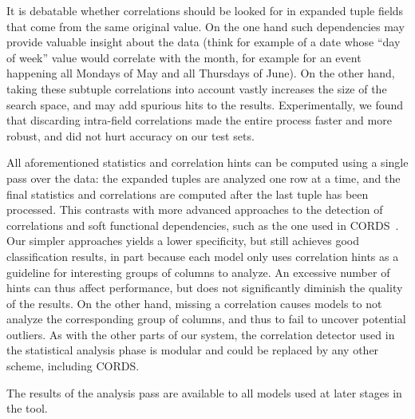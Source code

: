 It is debatable whether correlations should be looked for in expanded tuple fields that come from the same original value. On the one hand such dependencies may provide valuable insight about the data (think for example of a date whose ``day of week'' value would correlate with the month, for example for an event happening all Mondays of May and all Thursdays of June). On the other hand, taking these subtuple correlations into account vastly increases the size of the search space, and may add spurious hits to the results. Experimentally, we found that discarding intra-field correlations made the entire process faster and more robust, and did not hurt accuracy on our test sets.

All aforementioned statistics and correlation hints can be computed using a single pass over the data: the expanded tuples are analyzed one row at a time, and the final statistics and correlations are computed after the last tuple has been processed. This contrasts with more advanced approaches to the detection of correlations and soft functional dependencies, such as the one used in CORDS~\cite{Ilyas2004}. Our simpler approaches yields a lower specificity, but still achieves good classification results, in part because each model only uses correlation hints as a guideline for interesting groups of columns to analyze. An excessive number of hints can thus affect performance, but does not significantly diminish the quality of the results. On the other hand, missing a correlation causes models to not analyze the corresponding group of columns, and thus to fail to uncover potential outliers. As with the other parts of our system, the correlation detector used in the statistical analysis phase is modular and could be replaced by any other scheme, including CORDS.

The results of the analysis pass are available to all models used at later stages in the tool.
